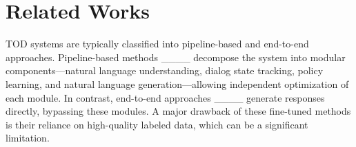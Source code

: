 \section{Related Works}

TOD systems are typically classified into pipeline-based and end-to-end approaches. Pipeline-based methods ____ decompose the system into modular components—natural language understanding, dialog state tracking, policy learning, and natural language generation—allowing independent optimization of each module. In contrast, end-to-end approaches ____ generate responses directly, bypassing these modules. A major drawback of these fine-tuned methods is their reliance on high-quality labeled data, which can be a significant limitation.

 




